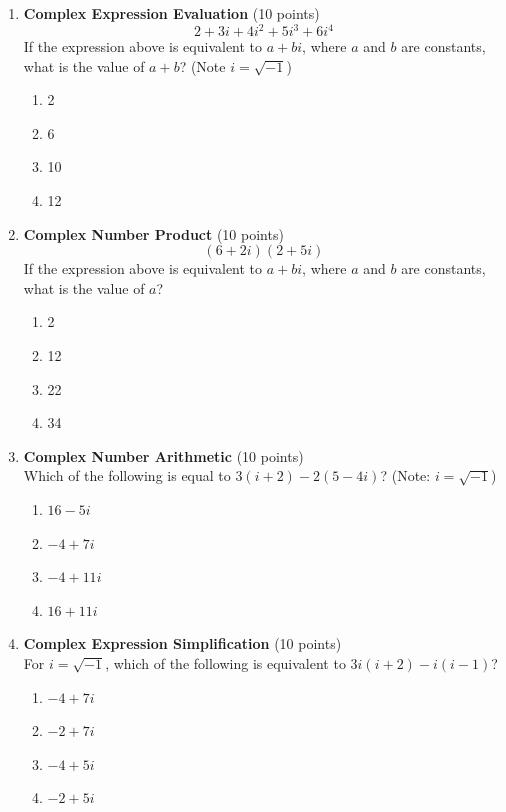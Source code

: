 \begin{enumerate}
  \item \textbf{Complex Expression Evaluation} (10 points)\\
  \[
  2+3 i+4 i^2+5 i^3+6 i^4
  \]
  If the expression above is equivalent to $a+b i$, where $a$ and $b$ are constants, what is the value of $a+b$? (Note $i=\sqrt{-1}$)
  \begin{enumerate}[label=(\Alph*)]
    \item 2
    \item 6
    \item 10
    \item 12
  \end{enumerate}
  \begin{subanswer}
  \end{subanswer}

  \item \textbf{Complex Number Product} (10 points)\\
  \[
  (6+2 i)(2+5 i)
  \]
  If the expression above is equivalent to $a+b i$, where $a$ and $b$ are constants, what is the value of $a$?
  \begin{enumerate}[label=(\Alph*)]
    \item 2
    \item 12
    \item 22
    \item 34
  \end{enumerate}
  \begin{subanswer}
  \end{subanswer}

  \item \textbf{Complex Number Arithmetic} (10 points)\\
  Which of the following is equal to $3(i+2)-2(5-4 i)$? (Note: $i=\sqrt{-1}$)
  \begin{enumerate}[label=(\Alph*)]
    \item $16-5 i$
    \item $-4+7 i$
    \item $-4+11 i$
    \item $16+11 i$
  \end{enumerate}
  \begin{subanswer}
  \end{subanswer}

  \item \textbf{Complex Expression Simplification} (10 points)\\
  For $i=\sqrt{-1}$, which of the following is equivalent to $3 i(i+2)-i(i-1)$?
  \begin{enumerate}[label=(\Alph*)]
    \item $-4+7 i$
    \item $-2+7 i$
    \item $-4+5 i$
    \item $-2+5 i$
  \end{enumerate}
  \begin{subanswer}
  \end{subanswer}


\end{enumerate}
